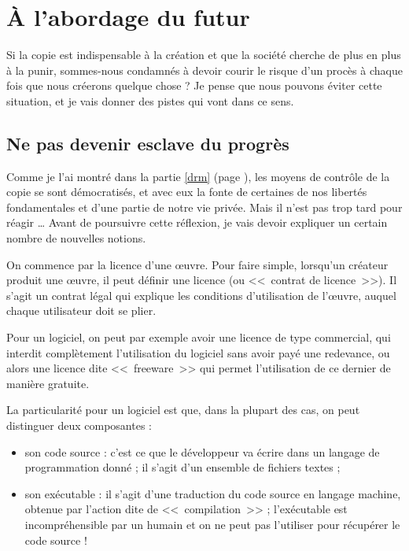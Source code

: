 \chapter{À l'abordage du futur}

Si la copie est indispensable à la création et que la société cherche de plus en plus à la punir, sommes-nous condamnés à devoir courir le risque d'un procès à chaque fois que nous créerons quelque chose ?
Je pense que nous pouvons éviter cette situation, et je vais donner des pistes qui vont dans ce sens.

\section{Ne pas devenir esclave du progrès}

Comme je l'ai montré dans la partie \ref*{drm} (page \pageref{drm}), les moyens de contrôle de la copie se sont démocratisés, et avec eux la fonte de certaines de nos libertés fondamentales et d'une partie de notre vie privée.
Mais il n'est pas trop tard pour réagir \dots{}
Avant de poursuivre cette réflexion, je vais devoir expliquer un certain nombre de nouvelles notions.

On commence par la licence d'une œuvre.
Pour faire simple, lorsqu'un créateur produit une œuvre, il peut définir une licence (ou <<~contrat de licence~>>).
Il s'agit un contrat légal qui explique les conditions d'utilisation de l'œuvre, auquel chaque utilisateur doit se plier.

Pour un logiciel, on peut par exemple avoir une licence de type commercial, qui interdit complètement l'utilisation du logiciel sans avoir payé une redevance, ou alors une licence dite <<~freeware~>> qui permet l'utilisation de ce dernier de manière gratuite.

La particularité pour un logiciel est que, dans la plupart des cas, on peut distinguer deux composantes :

\begin{itemize}
\item son code source : c'est ce que le développeur va écrire dans un langage de programmation donné ; il s'agit d'un ensemble de fichiers textes ;
\item son exécutable : il s'agit d'une traduction du code source en langage machine, obtenue par l'action dite de <<~compilation~>> ; l'exécutable est incompréhensible par un humain et on ne peut pas l'utiliser pour récupérer le code source !
\end{itemize}

